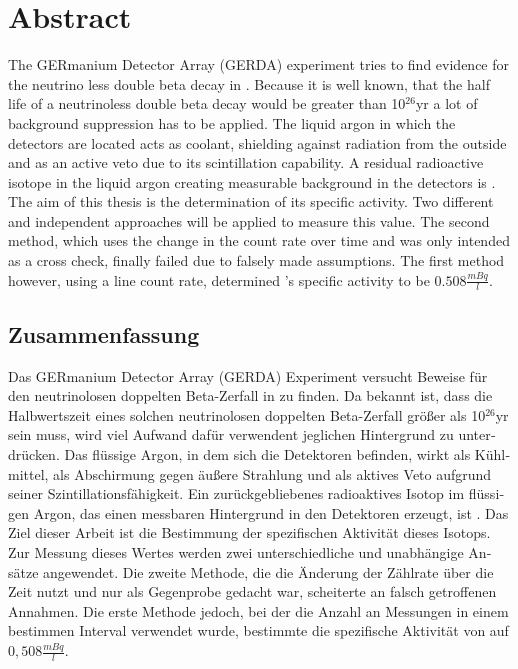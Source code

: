 \documentclass[encoding=utf8,british]{tumphthesis}
\begin{document}



\chapter*{Abstract}
The GERmanium Detector Array (GERDA) experiment tries to find evidence for the neutrino less double beta decay in .
Because it is well known, that the half life of a neutrinoless double beta decay would be greater than 10$^{26}$yr a lot of background suppression has to be applied.
The liquid argon in which the detectors are located acts as coolant, shielding against radiation from the outside and as an active veto due to its scintillation capability.
A residual radioactive isotope in the liquid argon creating measurable background in the detectors is .
The aim of this thesis is the determination of its specific activity.
Two different and independent approaches will be applied to measure this value.
The second method, which uses the change in the count rate over time and was only intended as a cross check, finally failed due to falsely made assumptions.
The first method however, using a line count rate, determined 's specific activity to be $0.508\frac{\unit{mBq}}{\unit{l}}$.

\begin{otherlanguage}{ngerman}
\chapter*{Zusammenfassung}
Das GERmanium Detector Array (GERDA) Experiment versucht Beweise für den neutrinolosen doppelten Beta-Zerfall in  zu finden.
Da bekannt ist, dass die Halbwertszeit eines solchen neutrinolosen doppelten Beta-Zerfall größer als 10$^{26}$yr sein muss, wird viel Aufwand dafür verwendent jeglichen Hintergrund zu unterdrücken.
Das flüssige Argon, in dem sich die Detektoren befinden, wirkt als Kühlmittel, als Abschirmung gegen äußere Strahlung und als aktives Veto aufgrund seiner Szintillationsfähigkeit.
Ein zurückgebliebenes radioaktives Isotop im flüssigen Argon, das einen messbaren Hintergrund in den Detektoren erzeugt, ist .
Das Ziel dieser Arbeit ist die Bestimmung der spezifischen Aktivität dieses Isotops.
Zur Messung dieses Wertes werden zwei unterschiedliche und unabhängige Ansätze angewendet.
Die zweite Methode, die die Änderung der Zählrate über die Zeit nutzt und nur als Gegenprobe gedacht war, scheiterte an falsch getroffenen Annahmen.
Die erste Methode jedoch, bei der die Anzahl an Messungen in einem bestimmen Interval verwendet wurde, bestimmte die spezifische Aktivität von  auf $0,508\frac{mBq} {\unit{l}}$.
\end{otherlanguage}
\end{document}
